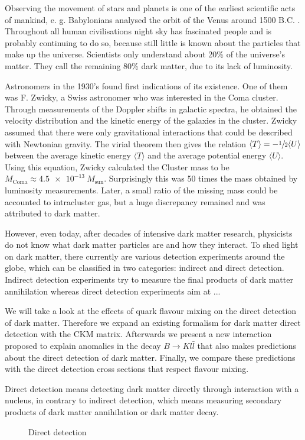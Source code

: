 Observing the movement of stars and planets is one of the earliest scientific acts of mankind, e. g. Babylonians analysed the orbit of the Venus around 1500 B.C. \cite{History}. Throughout all human civilisations night sky has fascinated people and is probably continuing to do so, because still little is known about the particles that make up the universe. Scientists only understand about 20\% of the universe's matter. They call the remaining 80\% dark matter, due to its lack of luminosity. \cite{DM}


Astronomers in the 1930's found first indications of its existence. One of them was F. Zwicky, a Swiss astronomer who was interested in the Coma cluster. Through measurements of the Doppler shifts in galactic spectra, he obtained the velocity distribution and the kinetic energy of the galaxies in the cluster. Zwicky assumed that there were only gravitational interactions that could be described with Newtonian gravity. The virial theorem then gives the relation $\langle T\rangle = -\sfrac{1}{2}\langle U\rangle$ between the average kinetic energy $\langle T\rangle$ and the average potential energy $\langle U\rangle$. Using this equation, Zwicky calculated the Cluster mass to be $M_\text{Coma} \approx \SI{4.5e-13}{}M_\text{sun}$. Surprisingly this was 50 times the mass obtained by luminosity measurements. Later, a small ratio of the missing mass could be accounted to intracluster gas, but a huge discrepancy remained and was attributed to dark matter. \cite{DM}


However, even today, after decades of intensive dark matter research, physicists do not know what dark matter particles are and how they interact. To shed light on dark matter, there currently are various detection experiments around the globe, which can be classified in two categories: indirect and direct detection. Indirect detection experiments try to measure the final products of dark matter annihilation whereas direct detection experiments aim at ...



We will take a look at the effects of quark flavour mixing on the direct detection of dark matter. Therefore we expand an existing formalism for dark matter direct detection with the CKM matrix. Afterwards we present a new interaction proposed to explain anomalies in the decay $B\rightarrow Kl\bar{l}$ that also makes predictions about the direct detection of dark matter. Finally, we compare these predictions with the direct detection cross sections that respect flavour mixing.

Direct detection means detecting dark matter directly through interaction with a nucleus, in contrary to indirect detection, which means measuring secondary products of dark matter annihilation or dark matter decay.


\begin{figure}
	\centering
	
	\caption{Direct detection}
	\label{fig:DirectDetection}
\end{figure}